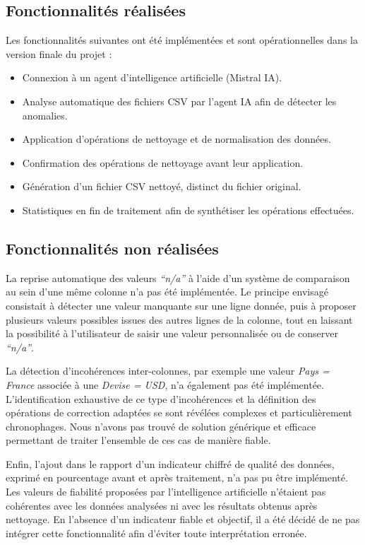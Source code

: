 \documentclass[a4paper, 12pt, twoside]{article}
\begin{document}
\subsection*{Fonctionnalités réalisées}

Les fonctionnalités suivantes ont été implémentées et sont opérationnelles dans la version finale du projet :
\begin{itemize}
    \item Connexion à un agent d’intelligence artificielle (Mistral IA).
    \item Analyse automatique des fichiers CSV par l’agent IA afin de détecter les anomalies.
    \item Application d’opérations de nettoyage et de normalisation des données.
    \item Confirmation des opérations de nettoyage avant leur application.
    \item Génération d’un fichier CSV nettoyé, distinct du fichier original.
    \item Statistiques en fin de traitement afin de synthétiser les opérations effectuées.
\end{itemize}

\subsection*{Fonctionnalités non réalisées}

La reprise automatique des valeurs \textit{``n/a''} à l’aide d’un système de comparaison au sein d’une même colonne n’a pas été implémentée. Le principe envisagé consistait à détecter une valeur manquante sur une ligne donnée, puis à proposer plusieurs valeurs possibles issues des autres lignes de la colonne, tout en laissant la possibilité à l’utilisateur de saisir une valeur personnalisée ou de conserver \textit{``n/a''}.

La détection d’incohérences inter-colonnes, par exemple une valeur \textit{Pays = France} associée à une \textit{Devise = USD}, n’a également pas été implémentée. L’identification exhaustive de ce type d’incohérences et la définition des opérations de correction adaptées se sont révélées complexes et particulièrement chronophages. Nous n’avons pas trouvé de solution générique et efficace permettant de traiter l’ensemble de ces cas de manière fiable.

Enfin, l’ajout dans le rapport d’un indicateur chiffré de qualité des données, exprimé en pourcentage avant et après traitement, n’a pas pu être implémenté. Les valeurs de fiabilité proposées par l’intelligence artificielle n’étaient pas cohérentes avec les données analysées ni avec les résultats obtenus après nettoyage. En l’absence d’un indicateur fiable et objectif, il a été décidé de ne pas intégrer cette fonctionnalité afin d’éviter toute interprétation erronée.
\end{document}

